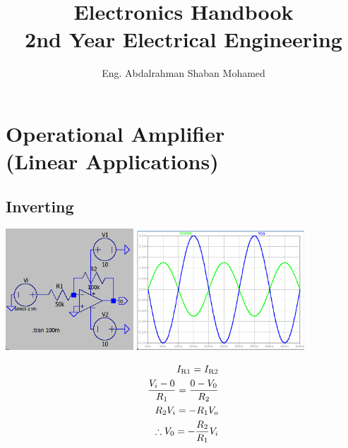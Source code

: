 \documentclass[a4paper, 12pt]{report}
\title{\huge Electronics Handbook \\ 2nd Year Electrical Engineering}
\author{Eng. Abdalrahman Shaban Mohamed}
\date{}
\begin{document}
\maketitle
\tableofcontents

\chapter{Operational Amplifier\\(Linear Applications)}
\section{Inverting}
\begin{center}
\includegraphics[width=0.36\textwidth]{figures/11c.png} \quad \quad
\includegraphics[width=0.47\textwidth]{figures/11w.png} \\
\end{center}
\begin{equation} 
    \notag
    \begin{align*}
    I_\text{R1} = I_\text{R2}\\
    \frac{V_i-0}{R_1} = \frac{0 - V_0}{R_2}\\
    R_2V_i = -R_1V_o\\
    \therefore V_0 = -\frac{R_2}{R_1}V_i
    \end{align}
\end{equation}
\end{document}
